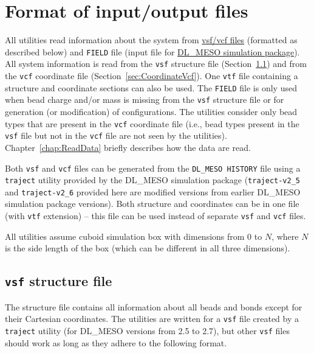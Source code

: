 \chapter{Format of input/output files}\label{chap:input}

All utilities read information about the system from
\href{https://github.com/olenz/vtfplugin/wiki/VTF-format}{vsf/vcf files}
(formatted as described below) and \texttt{FIELD} file (input file for
\href{http://www.scd.stfc.ac.uk//research/app/ccg/software/DL_MESO/40694.aspx}{DL\_MESO
simulation package}).
All system information is read from the \texttt{vsf} structure file
(Section~\ref{sec:StructureVsf}) and from the \texttt{vcf} coordinate file
(Section~\ref{sec:CoordinateVcf}). One \texttt{vtf} file containing a
structure and coordinate sections can also be used.
The \texttt{FIELD} file is only used when bead charge
and/or mass is missing from the \texttt{vsf} structure file or for
generation (or modification) of configurations.
The utilities consider only bead types that are present in the \texttt{vcf}
coordinate file (i.e., bead types present in the \texttt{vsf} file but not
in the \texttt{vcf} file are not seen by the utilities).
Chapter~\ref{chap:ReadData} briefly describes how the data are read.

Both \texttt{vsf} and \texttt{vcf} files can be generated from the
\texttt{DL\_MESO HISTORY} file using a
\texttt{traject} utility provided by the DL\_MESO simulation package
(\texttt{traject-v2\_5} and \texttt{traject-v2\_6} provided here are
modified versions from earlier DL\_MESO simulation package versions).  Both
structure and coordinates can be in one file (with \texttt{vtf} extension)
-- this file can be used instead of separate \texttt{vsf} and
\texttt{vcf} files.

All utilities assume cuboid simulation box with dimensions from 0 to $N$,
where $N$ is the side length of the box (which can be different in all
three dimensions).

\section{\texttt{vsf} structure file} \label{sec:StructureVsf} %

The structure file contains all information about all beads and bonds
except for their Cartesian coordinates. The utilities are written for a
\texttt{vsf} file created by a \texttt{traject} utility (for DL\_MESO
versions from 2.5 to 2.7), but other \texttt{vsf} files should work as long
as they adhere to the following format.

